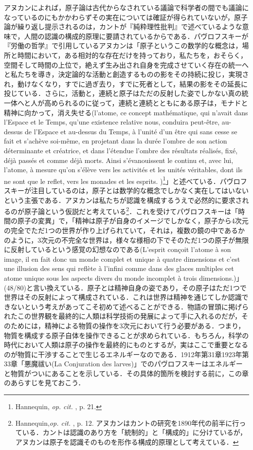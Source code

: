 アヌカンによれば，原子論は古代からなされている議論で科学者の間でも議論になっているのにもかかわらずその実在については確証が得られていないが，原子論が繰り返し提示されるのは，カントが『純粋理性批判』で述べているような意味で，人間の認識の構成的原理に要請されているからである．パヴロフスキーが『労働の哲学』で引用しているアヌカンは「原子というこの数学的な概念は，場所と時間において，ある相対的な存在だけを持っており，私たちを，おそらく，空間そして時間の上位で，絶えず生み出され自身を完成させていく存在の統一へと私たちを導き，決定論的な活動と創造するものの影をその持続に投じ，実現され，動けなくなり，すでに過ぎ去り，すでに死者として，結果の影をその延長に投じている．さらに，活動と，連続と原子はただの反射した姿でしかない真の統一体へと人が高められるのに従って，連続と連続とともにある原子は，モナドと精神に向かって，消え失せる(l'atome, ce concept mathématique, qui n'avait dans l'Espace et le Temps, qu'une existence relative nous, conduira peut-être, au-dessus de l'Espace et au-dessus du Temps, à l'unité d'un être qui sans cesse se fait et s'achève soi-même, en projetant dans la durée l'ombre de son action déterminante et créatrice, et dans l'étendue l'ombre des résultats réalisés, fixé, déjà passés et comme déjà morts. Ainsi s'évanouissent le continu et, avec lui, l'atome, à mesure qu'on s'élève vers les activités et les unités véritables, dont ils ne sont que le reflet, vers les monades et les esprits. )\footnote{Hannequin, \emph{op. cit. }, p. 21. }」と述べている．パヴロフスキーが注目しているのは，原子とは数学的な概念でしかなく実在してはいないという主張である．アヌカンは私たちが認識を構成するうえで必然的に要求されるのが原子論という仮説だと考えている\footnote{Hannequin,\emph{op. cit.} ,  p. 12.  アヌカンはカントの研究を1890年代の前半に行っている．カントは認識のあり方を「統制的」と「構成的」に分けているが，アヌカンは原子を認識そのものを形作る構成的原理として考えている．}．これを受けてパヴロフスキーは「時間の原子の変異」で，「精神は原子が自身のイメージでしかなく，原子から4次元の完全でただ1つの世界が作り上げられていて，それは，複数の鏡の中であるかのように，3次元の不完全な世界は，様々な様相の下でそのただ1つの原子が無限に反射しているという感覚の幻想なのである(L'esprit conçoit l'atome à son image, il en fait donc un monde complet et unique à quatre dimensions et c'est une illusion des sens qui reflète à l'infini comme dans des glaces multiples cet atome unique sous les aspects divers du monde incomplet à trois dimensions.)」(48/80)と言い換えている．原子とは精神自身の姿であり，その原子はただ1つで世界はその反射によって構成されている．これは世界は精神を通じてしか認識できないという考えがあってこそ初めて述べることができる．物語の冒頭に掲げられたこの世界観を最終的に人類は科学技術の発展によって手に入れるのだが，そのためには，精神による物質の操作を3次元において行う必要がある．つまり，物質を構成する原子自体を操作できることが求められている．もちろん，科学の時代において人類は原子の操作を最終的にものとするが，実はここで重要となるのが物質に干渉することで生じるエネルギーなのである．1912年第31章1923年第33章「悪魔祓い(La Conjuration des larves)」でのパヴロフスキーはエネルギーと物質がついにあることを示している．その具体的箇所を検討する前に，この章のあらすじを見ておこう．

